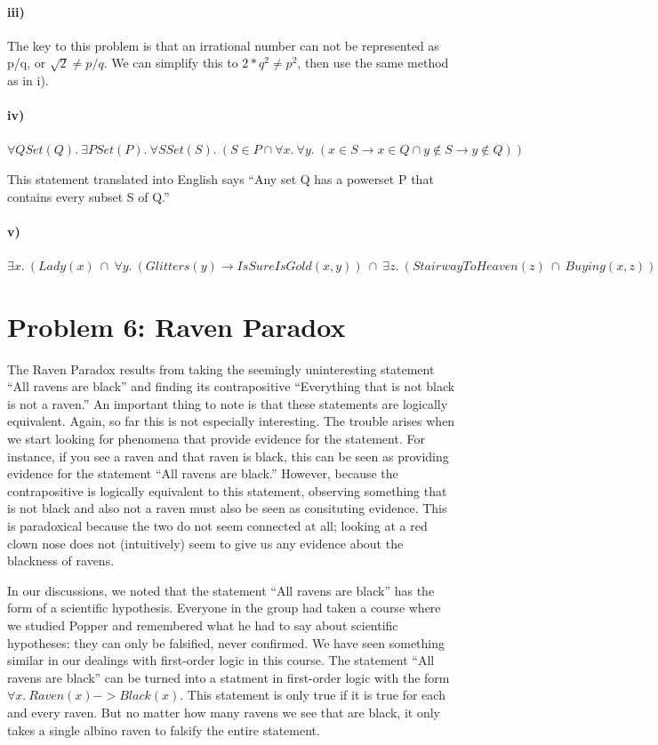 \documentclass[10pt,letter]{article}
\begin{document}
\paragraph{iii)} The key to this problem is that an irrational number can not be represented as p/q, or $\sqrt{2} \not = p/q$. We can simplify this to $2 * q^2 \not = p^2$, then use the same method as in i).

\paragraph{iv)}
$\forall Q Set(Q) .\ \exists P Set(P) .\ \forall S Set(S) .\ (S \in P \cap \forall x .\ \forall y .\ (x \in S \rightarrow x \in Q \cap y \not \in S \rightarrow y \not \in Q))$

This statement translated into English says ``Any set Q has a powerset P that contains every subset S of Q.''
\paragraph{v)}
$\exists x .\ (Lady(x)\ \cap\ \forall y .\ (Glitters(y) \rightarrow IsSureIsGold(x, y))\ \cap\ \exists z .\ (StairwayToHeaven(z)\ \cap\ Buying(x, z)))$

\section*{Problem 6: Raven Paradox}
The Raven Paradox results from taking the seemingly uninteresting statement ``All ravens are black'' and finding its contrapositive ``Everything that is not black is not a raven.'' An important thing to note is that these statements are logically equivalent. Again, so far this is not especially interesting. The trouble arises when we start looking for phenomena that provide evidence for the statement. For instance, if you see a raven and that raven is black, this can be seen as providing evidence for the statement ``All ravens are black.'' However, because the contrapositive is logically equivalent to this statement, observing something that is not black and also not a raven must also be seen as consituting evidence. This is paradoxical because the two do not seem connected at all; looking at a red clown nose does not (intuitively) seem to give us any evidence about the blackness of ravens. 

In our discussions, we noted that the statement ``All ravens are black'' has the form of a scientific hypothesis. Everyone in the group had taken a course where we studied Popper and remembered what he had to say about scientific hypotheses: they can only be falsified, never confirmed. We have seen something similar in our dealings with first-order logic in this course. The statement ``All ravens are black'' can be turned into a statment in first-order logic with the form $\forall x .\ Raven(x) -> Black(x)$. This statement is only true if it is true for each and every raven. But no matter how many ravens we see that are black, it only takes a single albino raven to falsify the entire statement. 
\end{document}

